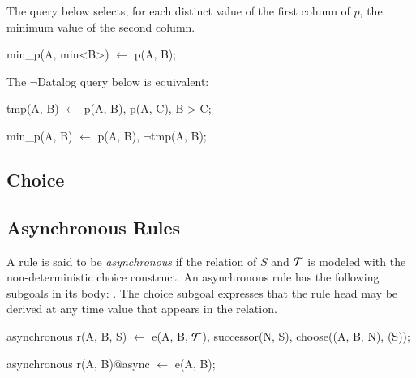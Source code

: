 \begin{example}
The query below selects, for each distinct value of the first column of $p$, the minimum 
value of the second column.

\begin{Dedalus}
min_p(A, min<B>) \(\leftarrow\)
  p(A, B);
\end{Dedalus}

The $\lnot$Datalog query below is equivalent:

\begin{Dedalus}

tmp(A, B)  \(\leftarrow\)
  p(A, B),
  p(A, C),
  B > C;
  
min_p(A, B) \(\leftarrow\)
  p(A, B),
  \(\lnot\)tmp(A, B);

\end{Dedalus}
\end{example}






\subsection{Choice}



\subsection{Asynchronous Rules}

A rule is said to be {\em asynchronous} if the relation of $S$ and
$\Tau$ is modeled with the non-deterministic choice construct.  An asynchronous rule
has the following subgoals in its body: .  The choice subgoal expresses that the rule head may
be derived at any time value that appears in the  relation.


\begin{Dedalus}
asynchronous
r(A, B, S) \(\leftarrow\)
  e(A, B, \(\Tau\)),
  successor(N, S),
  choose((A, B, N), (S));
\end{Dedalus}

\begin{Dedalus}
asynchronous
r(A, B)@async \(\leftarrow\) 
  e(A, B);
\end{Dedalus}



